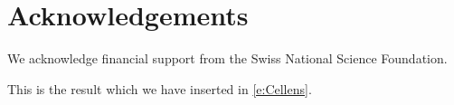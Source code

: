 \documentclass[a4paper,11pt]{article}
\def\bea{\begin{eqnarray}}
\def\eea{\end{eqnarray}}
\def\l {\langle}
\def\re {\rangle}
\def \De {\Delta}
\def \DH {\Delta_{\rm HI}}
\newcommand{\de}{\delta}
\def \Om {\Omega}
\newcommand{\bell}{\boldsymbol{\ell}}
\begin{document}
 
\section*{Acknowledgements}

We acknowledge financial support from the Swiss National Science Foundation.


\appendix

This is the result which we have inserted in \eqref{e:Cellens}.
%


\end{document}
